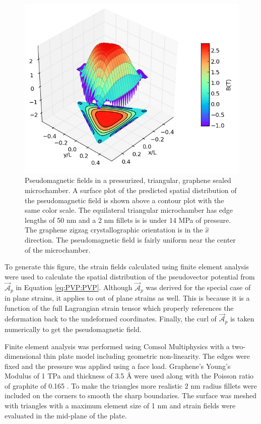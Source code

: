\begin{figure}
  \begin{center}
  \includegraphics[scale=.75]{Figs_PVP/Triangle_PMF.png}
  \end{center}
  \caption[Pseudomagnetic fields in a pressurized, triangular, graphene sealed microchamber]{\label{fig:PVP:triangle} Pseudomagnetic fields in a pressurized, triangular, graphene sealed microchamber.
  A surface plot of the predicted spatial distribution of the pseudomagnetic field is shown above a contour plot with the same color scale.
  The equilateral triangular microchamber has edge lengths of 50 nm and a 2 nm fillets is is under 14 MPa of pressure.
  The graphene zigzag crystallographic orientation is in the $\hat{x}$ direction.
  The pseudomagnetic field is fairly uniform near the center of the microchamber.
  }
\end{figure}

To generate this figure, the strain fields calculated using finite element analysis were used to calculate the spatial distribution of the pseudovector potential from $\vec{\mathcal{A}}_p$ in Equation \ref{eq:PVP:PVP}.
Although $\vec{\mathcal{A}}_p$ was derived for the special case of in plane strains, it applies to out of plane strains as well.
This is because it is a function of the full Lagrangian strain tensor which properly references the deformation back to the undeformed coordinates.
Finally, the curl of $\vec{\mathcal{A}}_p$ is taken numerically to get the pseudomagnetic field.

Finite element analysis was performed using Comsol Multiphysics with a two-dimensional thin plate model including geometric non-linearity.
The edges were fixed and the pressure was applied using a face load.
Graphene's Young's Modulus of 1 TPa and thickness of 3.5 \AA \cite{Lee2008} were used along with the Poisson ratio of graphite of 0.165 \cite{Blakslee1970}.
To make the triangles more realistic 2 nm radius fillets were included on the corners to smooth the sharp boundaries.
The surface was meshed with triangles with a maximum element size of 1 nm and strain fields were evaluated in the mid-plane of the plate.

